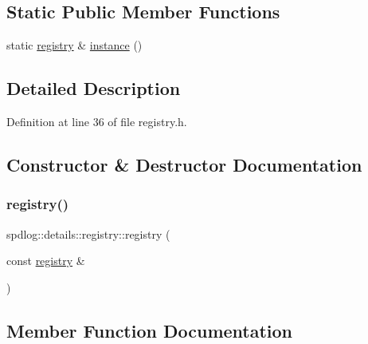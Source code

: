 \subsection*{Static Public Member Functions}
\begin{DoxyCompactItemize}
\item 
static \hyperlink{classspdlog_1_1details_1_1registry}{registry} \& \hyperlink{classspdlog_1_1details_1_1registry_a58a1bbb352f751f6b729bc57bfadd6be}{instance} ()
\end{DoxyCompactItemize}


\subsection{Detailed Description}


Definition at line 36 of file registry.\+h.



\subsection{Constructor \& Destructor Documentation}
\mbox{\label{classspdlog_1_1details_1_1registry_ab5c1a2f7b8e2e9eec4e0fa75d9167f3b}} 
\subsubsection{\texorpdfstring{registry()}{registry()}}
{\footnotesize\ttfamily spdlog\+::details\+::registry\+::registry (\begin{DoxyParamCaption}\item[{const \hyperlink{classspdlog_1_1details_1_1registry}{registry} \&}]{ }\end{DoxyParamCaption})\hspace{0.3cm}{\ttfamily [delete]}}



\subsection{Member Function Documentation}
\mbox{\label{classspdlog_1_1details_1_1registry_a781454ea62603cfaebddf14ec2ec9985}} 
